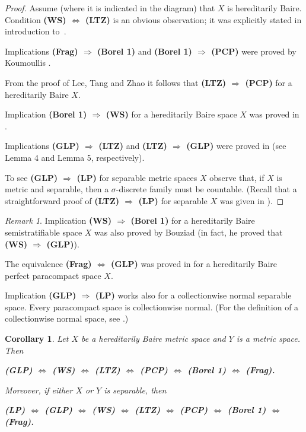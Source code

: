 \documentclass[a4paper]{amsart}
\theoremstyle{plain}
\newtheorem{corollary}[theorem]{Corollary}
\theoremstyle{definition}
\theoremstyle{remark}
\newtheorem{remark}[theorem]{Remark}
\numberwithin{equation}{section}
\begin{document}
 \begin{proof} 
 Assume (where it is indicated in the diagram) that $X$ is hereditarily Baire. 
 Condition {\bf (WS) $\Leftrightarrow$ (LTZ)} is an obvious observation;
 it was explicitly stated in introduction to~\cite{Bou}.

 	Implications {\bf (Frag) $\Rightarrow$ (Borel 1)} and {\bf (Borel 1) $\Rightarrow$ (PCP)} were proved by Koumoullis \cite[Theorem 4.12]{Kou}. 
 	 	
 	From the proof of Lee, Tang and Zhao \cite{LTZ} it follows that 
    {\bf (LTZ) $\Rightarrow$ (PCP)} for a hereditarily Baire $X$. 
 	
 	Implication {\bf (Borel 1) $\Rightarrow$ (WS)} for a hereditarily Baire space $X$ was proved in \cite[Theorem 12]{KM}.
   	

 	Implications {\bf (GLP) $\Rightarrow$ (LTZ)} and {\bf (LTZ) $\Rightarrow$ (GLP)} were proved in \cite{KM} (see Lemma 4 and Lemma 5, respectively). 

 	To see {\bf (GLP) $\Rightarrow$ (LP)} for separable metric spaces $X$ observe that, if $X$ is metric and separable, then a $\sigma$-discrete family must be countable.
    (Recall that a straightforward proof of {\bf (LTZ) $\Rightarrow$ (LP)} for separable $X$ was given in \cite[Theorem 5]{FC}).
 \end{proof}
 
 \begin{remark} 	
 	Implication  {\bf (WS) $\Rightarrow$ (Borel 1)}  for a hereditarily Baire semistratifiable space $X$ was also proved by Bouziad \cite[Theorem 4.5]{Bou} (in fact, he proved that {\bf (WS) $\Rightarrow$ (GLP)}).
 	
 	The equivalence  {\bf (Frag) $\Leftrightarrow$ (GLP)} was proved in \cite[Theorem B]{K2019} for a hereditarily Baire perfect paracompact space $X$. 

    Implication {\bf (GLP) $\Rightarrow$ (LP)} works also for a collectionwise normal separable space. Every paracompact space is collectionwise normal. (For the definition of a collectionwise normal space, see \cite[p. 305]{Eng}.)
 \end{remark}
 
 
  \begin{corollary}
 	Let $X$ be a hereditarily Baire metric space and $Y$ is a metric space. Then 
 	\begin{center}{\rm 
 			{\bf 	(GLP) $\Leftrightarrow$  (WS) $\Leftrightarrow$ (LTZ) $\Leftrightarrow$ (PCP) $\Leftrightarrow$ (Borel 1) $\Leftrightarrow$ (Frag).}
 		}
 	\end{center}
 	Moreover, if either $X$ or $Y$ is separable, then
 	\begin{center}{\rm 
 			{\bf 	 (LP) $\Leftrightarrow$ (GLP) $\Leftrightarrow$ (WS) $\Leftrightarrow$ (LTZ) $\Leftrightarrow$ (PCP) $\Leftrightarrow$ (Borel 1) $\Leftrightarrow$ (Frag).}
 		}
 	\end{center}
 \end{corollary}
 
\end{document}
